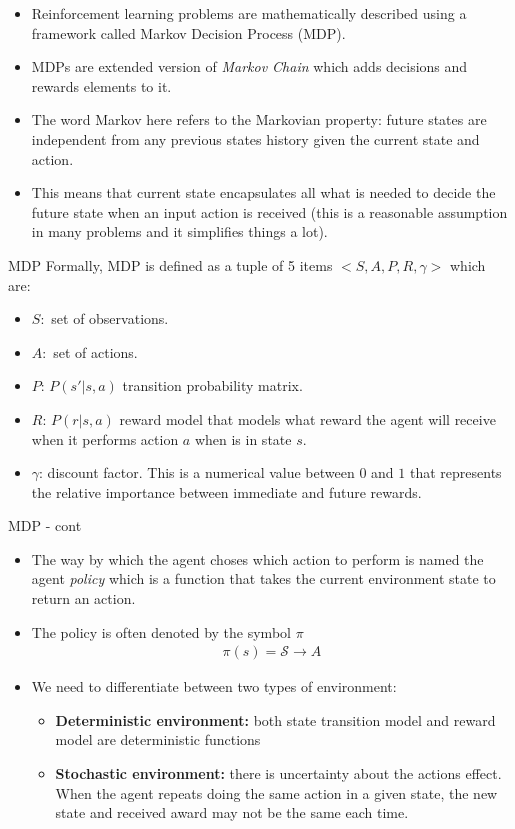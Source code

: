 \documentclass[10pt,mathserif]{beamer}
\begin{document}
\begin{frame}
\begin{itemize}
\item Reinforcement learning problems are mathematically described using a framework called Markov Decision Process (MDP).
\item MDPs are extended version of \textit{Markov Chain} which adds decisions and rewards elements to it. 
\item The word Markov here refers to the Markovian property: future states are independent from any previous states history given the current state and action.
\item This means that current state encapsulates all what is needed to decide the future state when an input action is received (this is a reasonable assumption in many problems and it simplifies things a lot). 
\end{itemize}
\end{frame}

\begin{frame}{MDP}
Formally, MDP is defined as a tuple of 5 items $<S, A, P, R, \gamma >$ which are:
\begin{itemize}
\item $S:$ set of observations. 
\item $A:$ set of actions.
\item $P$: $P(s' | s,a)$ transition probability matrix.
\item $R$: $P(r | s,a)$ reward model that models what reward the agent will receive when it performs action $a$ when is in state $s$.
\item $\gamma$: discount factor. This is a numerical value between $0$ and $1$ that represents the relative importance between immediate and future rewards. \end{itemize}
\end{frame}

\begin{frame}{MDP - cont}
\begin{itemize}
\item The way by which the agent choses which action to perform is named the agent \textit{policy} which is
a function that takes the current environment state to return an action. 
\item The policy is often denoted by the symbol \textbf{$\pi$}
\begin{align} 
\pi(s) = \mathcal{S} \rightarrow A
\end{align}
\item We need to differentiate between two types of environment:
\begin{itemize}
\item \textbf{Deterministic environment:} both state transition model and reward model are deterministic functions
\item \textbf{Stochastic environment:} there is uncertainty about the actions effect. When the agent repeats doing the same action in a given state, the new state and received award may not be the same each time.
\end{itemize} 
\end{itemize}
\end{frame}
\end{document}
